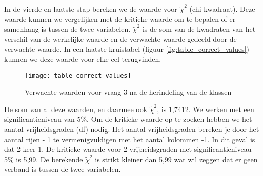 In de vierde en laatste stap bereken we de waarde voor $\tilde\chi^2$ (chi-kwadraat). Deze waarde kunnen we vergelijken met de kritieke waarde om te bepalen of er samenhang is tussen de twee variabelen. $\tilde\chi^2$ is de som van de kwadraten van het verschil van de werkelijke waarde en de verwachte waarde gedeeld door de verwachte waarde. In een laatste kruistabel (figuur \ref{fig:table_correct_values}) kunnen we deze waarde voor elke cel terugvinden.

\begin{figure}
	\centering
	\texttt{[image: table\_correct\_values]}
	\caption{Verwachte waarden voor vraag 3 na de herindeling van de klassen}
	\label{fig:tablecorrectvalues}
\end{figure}

De som van al deze waarden, en daarmee ook $\tilde\chi^2$, is 1,7412. We werken met een significantieniveau van 5\%. Om de kritieke waarde op te zoeken hebben we het aantal vrijheidsgraden (df) nodig. Het aantal vrijheidsgraden bereken je door het aantal rijen - 1 te vermenigvuldigen met het aantal kolommen -1. In dit geval is dat 2 keer 1. De kritieke waarde voor 2 vrijheidsgraden met significantieniveau 5\% is 5,99. De berekende $\tilde\chi^2$ is strikt kleiner dan 5,99 wat wil zeggen dat er geen verband is tussen de twee variabelen.

